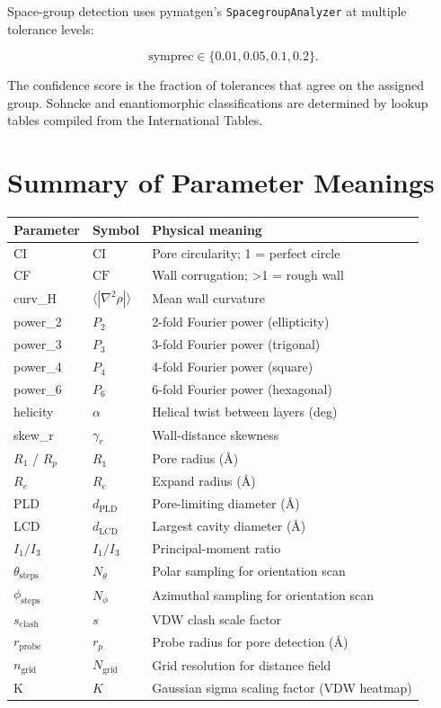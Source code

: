\documentclass[11pt,a4paper]{article}
\begin{document}
Space-group detection uses pymatgen's \texttt{SpacegroupAnalyzer} at
multiple tolerance levels:

\begin{equation}
\text{symprec} \in \{0.01, 0.05, 0.1, 0.2\}.
\end{equation}

The confidence score is the fraction of tolerances that agree on the
assigned group.  Sohncke and enantiomorphic classifications are
determined by lookup tables compiled from the International Tables.

\section{Summary of Parameter Meanings}

\begin{longtable}{llp{7cm}}
\toprule
Parameter & Symbol & Physical meaning \\
\midrule
\endhead
CI & $\text{CI}$ & Pore circularity; 1 = perfect circle \\
CF & $\text{CF}$ & Wall corrugation; >1 = rough wall \\
curv\_H & $\langle|\nabla^2\rho|\rangle$ & Mean wall curvature \\
power\_2 & $P_2$ & 2-fold Fourier power (ellipticity) \\
power\_3 & $P_3$ & 3-fold Fourier power (trigonal) \\
power\_4 & $P_4$ & 4-fold Fourier power (square) \\
power\_6 & $P_6$ & 6-fold Fourier power (hexagonal) \\
helicity & $\alpha$ & Helical twist between layers (deg) \\
skew\_r & $\gamma_r$ & Wall-distance skewness \\
$R_1$ / $R_p$ & $R_1$ & Pore radius (\AA) \\
$R_e$ & $R_e$ & Expand radius (\AA) \\
PLD & $d_{\text{PLD}}$ & Pore-limiting diameter (\AA) \\
LCD & $d_{\text{LCD}}$ & Largest cavity diameter (\AA) \\
$I_1/I_3$ & $I_1/I_3$ & Principal-moment ratio \\
$\theta_{\text{steps}}$ & $N_\theta$ & Polar sampling for orientation scan \\
$\phi_{\text{steps}}$ & $N_\phi$ & Azimuthal sampling for orientation scan \\
$s_{\text{clash}}$ & $s$ & VDW clash scale factor \\
$r_{\text{probe}}$ & $r_p$ & Probe radius for pore detection (\AA) \\
$n_{\text{grid}}$ & $N_{\text{grid}}$ & Grid resolution for distance field \\
K & $K$ & Gaussian sigma scaling factor (VDW heatmap) \\
\bottomrule
\end{longtable}
\end{document}
